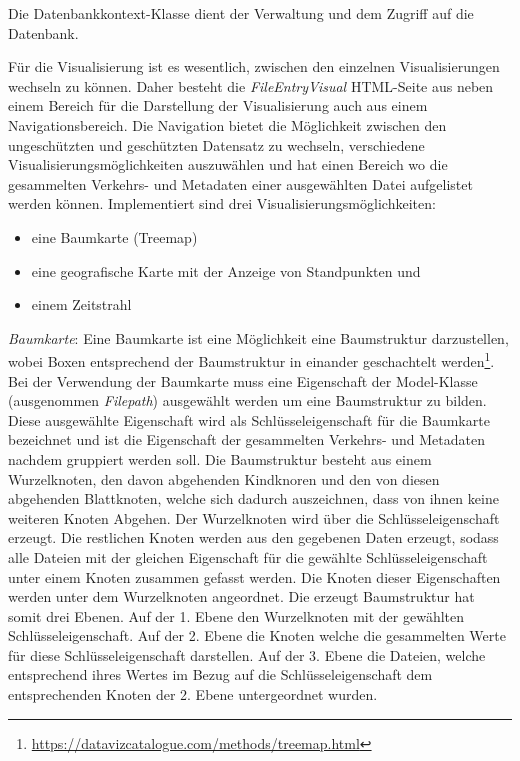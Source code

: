 \documentclass[
    fontsize=12pt,
    headings=small,
    parskip=half,           %
    bibliography=totoc,
    numbers=noenddot,       %
    open=any,               %
    ]{scrreprt}
\begin{document}
Die Datenbankkontext-Klasse dient der Verwaltung und dem Zugriff auf die Datenbank.

Für die Visualisierung ist es wesentlich, zwischen den einzelnen Visualisierungen wechseln zu können.
Daher besteht die \textit{FileEntryVisual} \ac{HTML}-Seite aus neben einem Bereich für die Darstellung der Visualisierung auch aus einem Navigationsbereich.
Die Navigation bietet die Möglichkeit zwischen den ungeschützten und geschützten Datensatz zu wechseln, verschiedene Visualisierungsmöglichkeiten auszuwählen und hat einen Bereich wo die gesammelten Verkehrs- und Metadaten einer ausgewählten Datei aufgelistet werden können.
Implementiert sind drei Visualisierungsmöglichkeiten:
\begin{itemize}
\item eine Baumkarte (Treemap)
\item eine geografische Karte mit der Anzeige von Standpunkten und
\item einem Zeitstrahl
\end{itemize} 

\textit{Baumkarte}: Eine Baumkarte ist eine Möglichkeit eine Baumstruktur darzustellen, wobei Boxen entsprechend der Baumstruktur in einander geschachtelt werden\footnote{\url{https://datavizcatalogue.com/methods/treemap.html}}. 
Bei der Verwendung der Baumkarte muss eine Eigenschaft der Model-Klasse (ausgenommen \textit{Filepath}) ausgewählt werden um eine Baumstruktur zu bilden.
Diese ausgewählte Eigenschaft wird als Schlüsseleigenschaft für die Baumkarte bezeichnet und ist die Eigenschaft der gesammelten Verkehrs- und Metadaten nachdem gruppiert werden soll.
Die Baumstruktur besteht aus einem Wurzelknoten, den davon abgehenden Kindknoren und den von diesen abgehenden Blattknoten, welche sich dadurch auszeichnen, dass von ihnen keine weiteren Knoten Abgehen.
Der Wurzelknoten wird über die Schlüsseleigenschaft erzeugt.
Die restlichen Knoten werden aus den gegebenen Daten erzeugt, sodass alle Dateien mit der gleichen Eigenschaft für die gewählte Schlüsseleigenschaft unter einem Knoten zusammen gefasst werden.
Die Knoten dieser Eigenschaften werden unter dem Wurzelknoten angeordnet.
Die erzeugt Baumstruktur hat somit drei Ebenen.
Auf der 1. Ebene den Wurzelknoten mit der gewählten Schlüsseleigenschaft.
Auf der 2. Ebene die Knoten welche die gesammelten Werte für diese Schlüsseleigenschaft darstellen.
Auf der 3. Ebene die Dateien, welche entsprechend ihres Wertes im Bezug auf die Schlüsseleigenschaft dem entsprechenden Knoten der 2. Ebene untergeordnet wurden.
\end{document}
